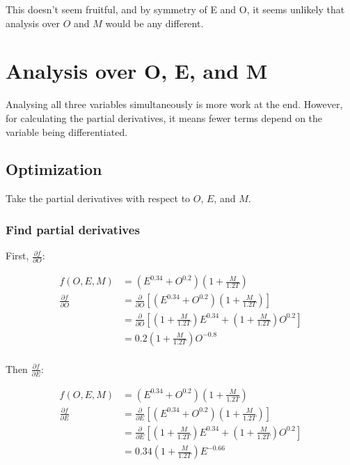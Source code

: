 \documentclass{article}
\begin{document}
This doesn't seem fruitful, and by symmetry of E and O, it seems unlikely that analysis over $O$ and $M$ would be any different.

\section{Analysis over O, E, and M}

Analysing all three variables simultaneously is more work at the end. However, for calculating the partial derivatives, it means fewer terms depend on the variable being differentiated.

\subsection{Optimization}

Take the partial derivatives with respect to $O$, $E$, and $M$.

\subsubsection{Find partial derivatives}

First, $\frac{\partial f}{\partial O}$:

\begin{equation}\label{eq:3dfdo}
  \begin{aligned}
    f(O, E, M) & = \left( E^{0.34} + O^{0.2} \right) \left( 1 + \frac{M}{1.2 T} \right) \\
    \frac{\partial f}{\partial O} & = \frac{\partial}{\partial O}\left[\left( E^{0.34} + O^{0.2} \right) \left( 1 + \frac{M}{1.2 T} \right)\right] \\
    & = \frac{\partial}{\partial O}\left[
      \left( 1 + \frac{M}{1.2 T} \right) E^{0.34} + \left( 1 + \frac{M}{1.2 T} \right) O^{0.2}
    \right] \\
    & = 0.2\left( 1 + \frac{M}{1.2 T} \right)O^{-0.8} \\
  \end{aligned}
\end{equation}

Then $\frac{\partial f}{\partial E}$:

\begin{equation}\label{eq:3dfde}
  \begin{aligned}
    f(O, E, M) & = \left( E^{0.34} + O^{0.2} \right) \left( 1 + \frac{M}{1.2 T} \right) \\
    \frac{\partial f}{\partial E} & = \frac{\partial}{\partial E}\left[\left( E^{0.34} + O^{0.2} \right) \left( 1 + \frac{M}{1.2 T} \right)\right] \\
    & = \frac{\partial}{\partial E}\left[
      \left( 1 + \frac{M}{1.2 T} \right) E^{0.34} + \left( 1 + \frac{M}{1.2 T} \right) O^{0.2}
    \right] \\
    & = 0.34\left( 1 + \frac{M}{1.2 T} \right)E^{-0.66} \\
  \end{aligned}
\end{equation}
\end{document}
